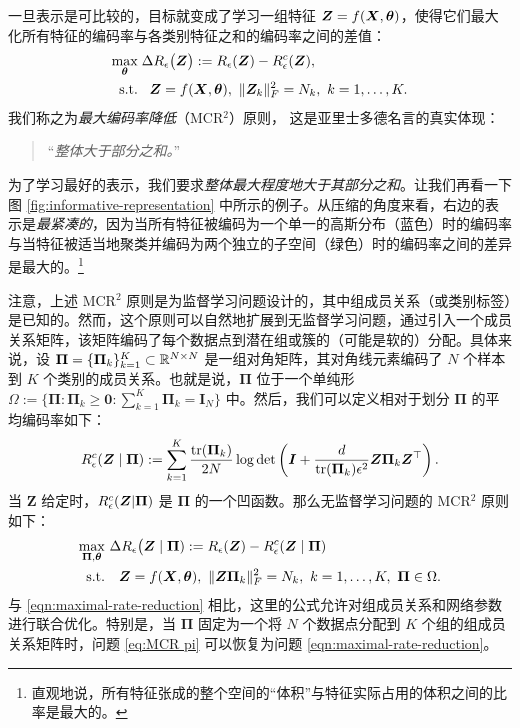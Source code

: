 \documentclass[../../book-main.tex]{subfiles}
\begin{document}
一旦表示是可比较的，目标就变成了学习一组特征 $\bm{Z}  = f(\bm{X}, \bm \theta)$，使得它们最大化所有特征的编码率与各类别特征之和的编码率之间的差值：
\begin{equation}
	\begin{aligned}
		\max_{\bm \theta } & \;  \Delta R_{\epsilon}\big(\Z \big) := R_{\epsilon}(\Z) - R_{\epsilon}^c(\Z ), \\
		\mbox{s.t.} & \ \ \, \Z = f(\bm X, \bm \theta),\  \|\Z_k\|_F^2                                          = N_k,\ k=1,\dots,K. 
	\end{aligned}
	\label{eqn:maximal-rate-reduction}
\end{equation}
我们称之为{\em 最大编码率降低}（MCR$^2$）原则，
这是亚里士多德名言的真实体现：
\begin{quote}
	\centering
	“{\em 整体大于部分之和。}”
\end{quote}
为了学习最好的表示，我们要求{\em 整体最大程度地大于其部分之和}。让我们再看一下图 \ref{fig:informative-representation} 中所示的例子。从压缩的角度来看，右边的表示是{\em 最紧凑的}，因为当所有特征被编码为一个单一的高斯分布（蓝色）时的编码率与当特征被适当地聚类并编码为两个独立的子空间（绿色）时的编码率之间的差异是最大的。\footnote{直观地说，所有特征张成的整个空间的“体积”与特征实际占用的体积之间的比率是最大的。}

 
    注意，上述 MCR$^2$ 原则是为监督学习问题设计的，其中组成员关系（或类别标签）是已知的。然而，这个原则可以自然地扩展到无监督学习问题，通过引入一个成员关系矩阵，该矩阵编码了每个数据点到潜在组或簇的（可能是软的）分配。具体来说，设 $\bm \Pi = \{\bm \Pi_k\}_{k=1}^K \subset \mathbb{R}^{N\times N}$ 是一组对角矩阵，其对角线元素编码了 $N$ 个样本到 $K$ 个类别的成员关系。也就是说，$\bm \Pi$ 位于一个单纯形 $\Omega := \{\bm \Pi: \bm \Pi_k \ge \bm 0: \sum_{k=1}^K \bm \Pi_k = \bm I_N\}$ 中。然后，我们可以定义相对于划分 $\bm \Pi$ 的平均编码率如下：
    \begin{align}\label{eq:MCRc}
        R_{\epsilon}^c(\bm{Z} \mid \bm \Pi) := \sum_{k=1}^K \frac{\mathrm{tr}(\bm \Pi_k)}{2N}\log\det\left(\bm I + \frac{d}{\mathrm{tr}(\bm \Pi_k)\epsilon^2}\bm Z\bm \Pi_k \bm Z^\top \right).
    \end{align}
    当 $\bm Z$ 给定时，$R_{\epsilon}^c(\bm{Z} \vert \bm \Pi)$ 是 $\bm \Pi$ 的一个凹函数。那么无监督学习问题的 MCR$^2$ 原则如下：
    \begin{align}\label{eq:MCR pi}
        \max_{\bm \Pi, \bm \theta} & \  \Delta R_{\epsilon}\big(\bm{Z}  \mid \bm \Pi) := R_{\epsilon}(\bm Z) - R_{\epsilon}^c(\bm{Z} \mid \bm \Pi) \notag \\ 
       \mathrm{s.t.}  & \ \ \ \bm Z = f(\bm X, \bm \theta),\ \|\bm Z \bm \Pi_k\|_F^2 = N_k,\ k = 1,\dots,K,\ \bm\Pi \in \Omega. 
    \end{align}
    与 \eqref{eqn:maximal-rate-reduction} 相比，这里的公式允许对组成员关系和网络参数进行联合优化。特别是，当 $\bm \Pi$ 固定为一个将 $N$ 个数据点分配到 $K$ 个组的组成员关系矩阵时，问题 \eqref{eq:MCR pi} 可以恢复为问题 \eqref{eqn:maximal-rate-reduction}。
 
\end{document}
